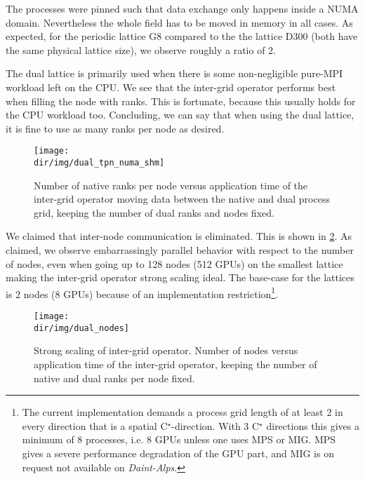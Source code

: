 The processes were pinned such that data exchange only happens inside a NUMA domain.
Nevertheless the whole field has to be moved in memory in all cases.
As expected, for the periodic lattice G8 compared to the the \Cstar lattice D300 (both have the same physical lattice size), we observe roughly a ratio of \num{2}.

The dual lattice is primarily used when there is some non-negligible pure-MPI workload left on the CPU.
We see that the inter-grid operator performs best when filling the node with ranks.
This is fortunate, because this usually holds for the CPU workload too.
Concluding, we can say that when using the dual lattice, it is fine to use as many ranks per node as desired.
\begin{figure}
    \centering
    \texttt{[image: \\dir/img/dual\_tpn\_numa\_shm]}
    \caption{Number of native ranks per node versus application time of the inter-grid operator moving data between the native and dual process grid, keeping the number of dual ranks and nodes fixed. }
    \label{fig:dual:tpn}
\end{figure}

We claimed that inter-node communication is eliminated.
This is shown in \cref{fig:dual:nodes}.
As claimed, we observe embarrassingly parallel behavior with respect to the number of nodes, even when going up to \num{128} nodes (\num{512} GPUs) on the smallest lattice making the inter-grid operator strong scaling ideal.
The base-case for the \Cstar lattices is \num{2} nodes (\num{8} GPUs) because of an implementation restriction\footnote{The current implementation demands a process grid length of at least 2 in every direction that is a spatial C$^\star$-direction. With 3 C$^\star$ directions this gives a minimum of 8 processes, i.e. 8 GPUs unless one uses MPS or MIG. MPS gives a severe performance degradation of the GPU part, and MIG is on request not available on \emph{Daint-Alps}.}.
\begin{figure}
    \centering
    \texttt{[image: \\dir/img/dual\_nodes]}
    \caption{Strong scaling of inter-grid operator. Number of nodes versus application time of the inter-grid operator, keeping the number of native and dual ranks per node fixed. }
    \label{fig:dual:nodes}
\end{figure}


